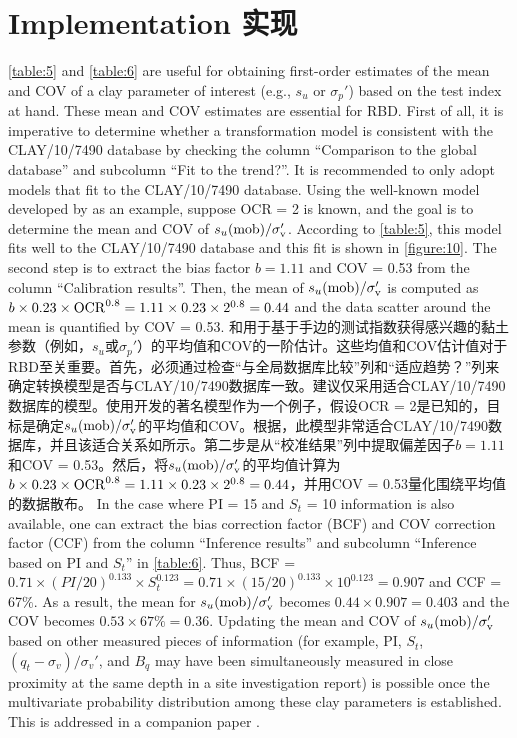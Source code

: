 \section{Implementation 实现}

\begin{Parallel}{0.60\textwidth}{}
    \ParallelLText
    {
        \autoref{table:5} and \autoref{table:6} are useful for obtaining first-order estimates of the mean and COV of a clay parameter of interest (e.g., $s_u$ or $\sigma_p'$) based on the test index at hand. These mean and COV estimates are essential for RBD. First of all, it is imperative to determine whether a transformation model is consistent with the CLAY/10/7490 database by checking the column “Comparison to the global database” and subcolumn “Fit to the trend?”. It is recommended to only adopt models that fit to the CLAY/10/7490 database. Using the well-known model developed by \citet{Jamiolkowski198557} as an example, suppose OCR = 2 is known, and the goal is to determine the mean and COV of $s_u(\rm{mob})/\sigma_v'$. According to \autoref{table:5}, this model fits well to the CLAY/10/7490 database and this fit is shown in \autoref{figure:10}. The second step is to extract the bias factor $b = 1.11$ and COV = 0.53 from the column “Calibration results”. Then, the mean of $s_u(\rm{mob})/\sigma_v'$ is computed as $b\times{}0.23\times{}\rm{OCR}^{0.8}=1.11\times{}0.23\times{}2^{0.8}=0.44$ and the data scatter around the mean is quantified by COV = 0.53.
    }
    \ParallelRText
    {
        和用于基于手边的测试指数获得感兴趣的黏土参数（例如，$s_u$或$\sigma_p'$）的平均值和COV的一阶估计。这些均值和COV估计值对于RBD至关重要。首先，必须通过检查“与全局数据库比较”列和“适应趋势？”列来确定转换模型是否与CLAY/10/7490数据库一致。建议仅采用适合CLAY/10/7490数据库的模型。使用\citet{Jamiolkowski198557}开发的著名模型作为一个例子，假设OCR = 2是已知的，目标是确定$s_u(\rm{mob})/\sigma_v'$的平均值和COV。根据，此模型非常适合CLAY/10/7490数据库，并且该适合关系如所示。第二步是从“校准结果”列中提取偏差因子$b = 1.11$和COV = 0.53。然后，将$s_u(\rm{mob})/\sigma_v'$的平均值计算为$b\times{}0.23\times{}\rm{OCR}^{0.8}=1.11\times{}0.23\times{}2^{0.8}=0.44$，并用COV = 0.53量化围绕平均值的数据散布。
    }
    \ParallelPar
    \ParallelLText
    {
        In the case where PI = 15 and $S_t$ = 10 information is also available, one can extract the bias correction factor (BCF) and COV correction factor (CCF) from the column “Inference results” and subcolumn “Inference based on PI and $S_t$” in \autoref{table:6}. Thus, BCF = $0.71\times{}(PI/20)^{0.133}\times{}S_t^{0.123} = 0.71\times{}(15/20)^{0.133}\times{}10^{0.123} = 0.907$ and CCF = 67$\%$. As a result, the mean for $s_u(\rm{mob})/\sigma_v'$ becomes $0.44\times{}0.907 = 0.403$ and the COV becomes $0.53\times{}67\%= 0.36$. Updating the mean and COV of $s_u(\rm{mob})/\sigma_v'$ based on other measured pieces of information (for example, PI, $S_t$, $(q_t-\sigma_v)/\sigma_v'$, and $B_q$ may have been simultaneously measured in close proximity at the same depth in a site investigation report) is possible once the multivariate probability distribution among these clay parameters is established. This is addressed in a companion paper \citep{Ching2014686}.
}
\end{Parallel}
